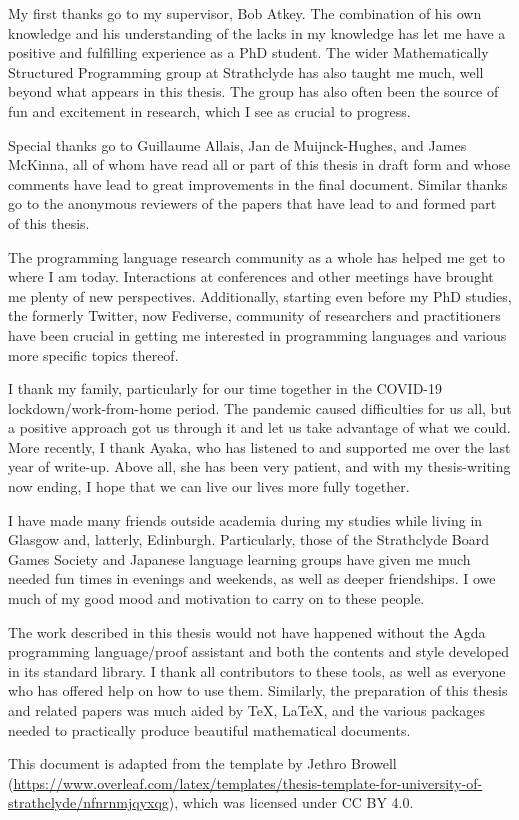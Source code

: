My first thanks go to my supervisor, Bob Atkey.
The combination of his own knowledge and his understanding of the lacks in my
knowledge has let me have a positive and fulfilling experience as a PhD student.
The wider Mathematically Structured Programming group at Strathclyde has also
taught me much, well beyond what appears in this thesis.
The group has also often been the source of fun and excitement in research,
which I see as crucial to progress.

Special thanks go to Guillaume Allais, Jan de Muijnck-Hughes, and James McKinna,
all of whom have read all or part of this thesis in draft form and whose
comments have lead to great improvements in the final document.
Similar thanks go to the anonymous reviewers of the papers that have lead to and
formed part of this thesis.

The programming language research community as a whole has helped me get to
where I am today.
Interactions at conferences and other meetings have brought me plenty of new
perspectives.
Additionally, starting even before my PhD studies, the formerly Twitter, now
Fediverse, community of researchers and practitioners have been crucial in
getting me interested in programming languages and various more specific topics
thereof.

I thank my family, particularly for our time together in the COVID-19
lockdown/work-from-home period.
The pandemic caused difficulties for us all, but a positive approach got us
through it and let us take advantage of what we could.
More recently, I thank Ayaka, who has listened to and supported me over the last
year of write-up.
Above all, she has been very patient, and with my thesis-writing now ending, I
hope that we can live our lives more fully together.

I have made many friends outside academia during my studies while living in
Glasgow and, latterly, Edinburgh.
Particularly, those of the Strathclyde Board Games Society and Japanese language
learning groups have given me much needed fun times in evenings and weekends, as
well as deeper friendships.
I owe much of my good mood and motivation to carry on to these people.

The work described in this thesis would not have happened without the Agda
programming language/proof assistant and both the contents and style developed
in its standard library.
I thank all contributors to these tools, as well as everyone who has offered
help on how to use them.
Similarly, the preparation of this thesis and related papers was much aided by
\TeX, \LaTeX, and the various packages needed to practically produce beautiful
mathematical documents.

This document is adapted from the template by Jethro Browell
(\url{https://www.overleaf.com/latex/templates/thesis-template-for-university-of-strathclyde/nfnrnmjqyxqg}),
which was licensed under CC BY 4.0.

